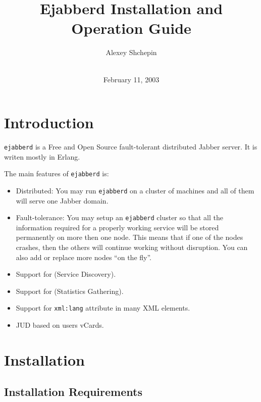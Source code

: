 \documentclass[10pt]{article}
\title{Ejabberd Installation and Operation Guide}
\author{Alexey Shchepin \\
  \ahrefurl{mailto:alexey@sevcom.net} \\
  \ahrefurl{xmpp:aleksey@jabber.ru}}
\date{February 11, 2003}
\newcommand{\logoscale}{0.7}
\newcommand{\insscaleimg}[2]{
  \imgsrc{#2}{}
  \begin{latexonly}
    \scalebox{#1}{\texttt{[image: \#2]}}
  \end{latexonly}
}
\newcommand{\ns}[1]{\texttt{#1}}
\newcommand{\ejabberd}{\texttt{ejabberd}}
\newcommand{\Jabber}{Jabber}
\begin{document}
\begin{titlepage}
  \maketitle{}
  
  {\centering
    \insscaleimg{\logoscale}{logo.png}
    \par
  }
\end{titlepage}
\tableofcontents{}

\newpage
\section{Introduction}
\label{sec:intro}

\ejabberd{} is a Free and Open Source fault-tolerant distributed \Jabber{}
server.  It is writen mostly in Erlang.

The main features of \ejabberd{} is:
\begin{itemize}
\item Distributed: You may run \ejabberd{} on a cluster of machines and all of
  them will serve one Jabber domain.
\item Fault-tolerance: You may setup an \ejabberd{} cluster so that all the
  information required for a properly working service will be stored
  permanently on more then one node.  This means that if one of the nodes
  crashes, then the others will continue working without disruption.
  You can also add or replace more nodes ``on the fly''.
\item Support for
  (Service Discovery).
\item Support for
  (Statistics Gathering).
\item Support for \ns{xml:lang} attribute in many XML elements.
\item JUD based on users vCards.
\end{itemize}




\section{Installation}
\label{sec:installation}


\subsection{Installation Requirements}
\label{sec:installreq}
\end{document}
